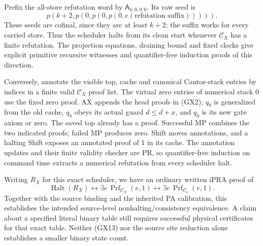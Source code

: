 Prefix the all-store refutation word by $\mathsf A_{k,0,0,0}$.
Its raw seed is
\[
     p(k+2,p(0,p(0,p(0,e(\text{refutation suffix}))))).
\]
These seeds are cofinal, since they are at least $k+2$; the suffix works
for every carried store.  Thus the scheduler halts from its clean start
whenever $\mathcal C_X$ has a finite refutation.  The projection equations,
draining bound and fixed clocks give explicit primitive recursive witnesses
and quantifier-free induction proofs of this direction.

Conversely, annotate the visible top, cache and canonical Cantor-stack
entries by indices in a finite valid $\mathcal C_X$ proof list.  The virtual
zero entries of numerical stack 0 use the fixed zero proof.  AX appends
the head proofs in (GX2); $q_9$ is generalized from the old cache,
$q_8$ obeys its actual guard $d\le d+x$, and $q_0$ is its new gate axiom
or zero.  The saved top already has a proof.  Successful MP combines the
two indicated proofs; failed MP produces zero.  Shift moves annotations,
and a halting Shift exposes an annotated proof of 1 in its cache.
The annotation updates and their finite validity checker are PR, so
quantifier-free induction on command time extracts a numerical refutation
from every scheduler halt.

Writing $R_X$ for this exact scheduler, we have an ordinary written iPRA
proof of
\[
 \operatorname{Halt}(R_X)
  \longleftrightarrow \exists e\,\operatorname{Prf}_{\mathcal C_X}(e,1)
  \longleftrightarrow \exists e\,\operatorname{Prf}_{\mathcal C_4}(e,1).
                                                               \tag{GX13}
\]
Together with the source binding and the inherited PA calibration, this
establishes the intended source-level nonhalting/consistency equivalence.
A claim about a specified literal binary table still requires successful
physical certificates for that exact table.  Neither (GX13) nor the source
site reduction alone establishes a smaller binary state count.
